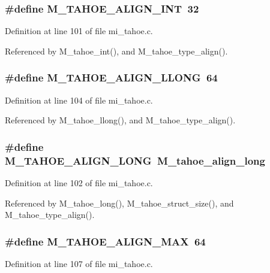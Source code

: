 \subsubsection{\setlength{\rightskip}{0pt plus 5cm}\#define M\_\-TAHOE\_\-ALIGN\_\-INT~32}\label{mi__tahoe_8c_2bb88298bfb2f5f9b375f9b55ca7dcc3}




Definition at line 101 of file mi\_\-tahoe.c.

Referenced by M\_\-tahoe\_\-int(), and M\_\-tahoe\_\-type\_\-align().
\subsubsection{\setlength{\rightskip}{0pt plus 5cm}\#define M\_\-TAHOE\_\-ALIGN\_\-LLONG~64}\label{mi__tahoe_8c_f9585261012854946ba2ec1be2866232}




Definition at line 104 of file mi\_\-tahoe.c.

Referenced by M\_\-tahoe\_\-llong(), and M\_\-tahoe\_\-type\_\-align().
\subsubsection{\setlength{\rightskip}{0pt plus 5cm}\#define M\_\-TAHOE\_\-ALIGN\_\-LONG~\bf{M\_\-tahoe\_\-align\_\-long}}\label{mi__tahoe_8c_f75b47b56ff485d885b32f6ca34fa819}




Definition at line 102 of file mi\_\-tahoe.c.

Referenced by M\_\-tahoe\_\-long(), M\_\-tahoe\_\-struct\_\-size(), and M\_\-tahoe\_\-type\_\-align().
\subsubsection{\setlength{\rightskip}{0pt plus 5cm}\#define M\_\-TAHOE\_\-ALIGN\_\-MAX~64}\label{mi__tahoe_8c_93db4b55d596475c8d4f5ebbc0e302e6}




Definition at line 107 of file mi\_\-tahoe.c.
